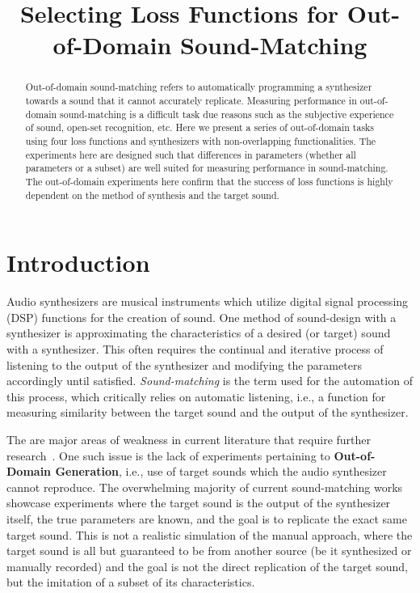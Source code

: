 \documentclass{article} %
\title{Selecting Loss Functions for Out-of-Domain Sound-Matching}
\newcommand{\OutDomain}{\textbf{Out-of-Domain Generation}\xspace}
\begin{document}

\address{University of Alberta}

\maketitle

\begin{abstract}
    Out-of-domain sound-matching refers to automatically programming a synthesizer towards a sound that it cannot accurately replicate. Measuring performance in out-of-domain sound-matching is a difficult task due reasons such as the subjective experience of sound, open-set recognition, etc. Here we present a series of out-of-domain tasks using four loss functions and synthesizers with non-overlapping functionalities. The experiments here are designed such that differences in parameters (whether all parameters or a subset) are well suited for measuring performance in sound-matching. The out-of-domain experiments here confirm that the success of loss functions is highly dependent on the method of synthesis and the target sound. 
\end{abstract}

\section{Introduction}
Audio synthesizers are musical instruments which utilize digital signal processing (DSP) functions for the creation of sound.  One method of sound-design with a synthesizer is approximating the characteristics of a desired (or target) sound with a synthesizer. This often requires the continual and iterative process of listening to the output of the synthesizer and modifying the parameters accordingly until satisfied. \textit{Sound-matching} is the term used for the automation of this process, which critically relies on automatic listening, i.e., a function for measuring similarity between the target sound and the output of the synthesizer. 

The are major areas of weakness in current literature that require further research~\cite{salimi2025soundmatching}. One such issue is the lack of experiments pertaining to \OutDomain, i.e., use of target sounds which the audio synthesizer cannot reproduce. The overwhelming majority of current sound-matching works showcase experiments where the target sound is the output of the synthesizer itself, the true parameters are known, and the goal is to replicate the exact same target sound. This is not a realistic simulation of the manual approach, where the target sound is all but guaranteed to be from another source (be it synthesized or manually recorded) and the goal is not the direct replication of the target sound, but the imitation of a subset of its characteristics.
\end{document}
